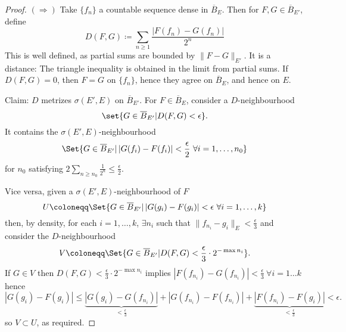 \documentclass[twoside]{article}
\begin{document}
\begin{proof}
  $(\Rightarrow)$ Take $\{f_n\}$ a countable sequence dense in $\overline{B}_E$. Then for $F,G \in \overline{B}_{E'}$, define
  \begin{equation*}
    D(F,G) \coloneqq \sum_{n \geq 1} \frac{|F(f_n) - G(f_n)|}{2^n}
  \end{equation*}
  This is well defined, as partial sums are bounded by $\|F-G\|_{E'}$.
  It is a distance: The triangle inequality is obtained in the limit from partial sums. If $D(F,G) = 0$, then $F=G$ on $\{f_n\}$, hence they agree on $\overline{B}_E$, and hence on $E$.

  Claim: $D$ metrizes $\sigma(E', E)$ on $\overline{B}_{E'}$.
  For $F \in \overline{B}_E$, consider a $D$-neighbourhood
  \begin{equation*}\set{G \in \overline{B}_{E'} | D(F,G) < \epsilon}.\end{equation*}
  It contains the $\sigma(E', E)$-neighbourhood
  \begin{equation*}\Set{G \in \overline{B}_{E'} | \left|G(f_i) - F(f_i)\right| < \frac{\epsilon}{2}\ \forall i=1,\dotsc,n_0}\end{equation*}
  for $n_0$ satisfying $2 \sum_{n \geq n_0} \frac{1}{2^n} \leq \frac{\epsilon}{2}$.

  Vice versa, given a $\sigma(E',E)$-neighbourhood of $F$
  \begin{equation*}U\coloneqq\Set{G \in \overline{B}_{E'} | \left|G(g_i) - F(g_i)\right| < \epsilon\ \forall i=1,\dotsc,k}\end{equation*}
  then, by density, for each $i=1,\dotsc,k$, $\exists n_i$ such that $\|f_{n_i} - g_i\|_E < \frac{\epsilon}{3}$ and
  consider the $D$-neighbourhood
  \begin{equation*}
    V\coloneqq \Set{G \in \overline{B}_{E'} | D(F,G)< \frac{\epsilon}{3} \cdot 2^{-\max n_i}}.
  \end{equation*}
  If $G \in V$ then $D(F, G) < \frac{\epsilon}{3}\cdot2^{-\max n_i}$ implies $|F(f_{n_i}) - G(f_{n_i})| < \frac{\epsilon}{3}\ \forall i = 1\dotsc k$ hence
  \begin{equation*}
    |G(g_i) - F(g_i)| \leq \underbrace{|G(g_i)-G(f_{n_i})|}_{< \frac{\epsilon}{3}} + |G(f_{n_i})-F(f_{n_i})| + \underbrace{|F(f_{n_i})-F(g_i)|}_{< \frac{\epsilon}{3}} < \epsilon.
  \end{equation*}
  so $V \subset U$, as required.


\end{proof}
\end{document}
